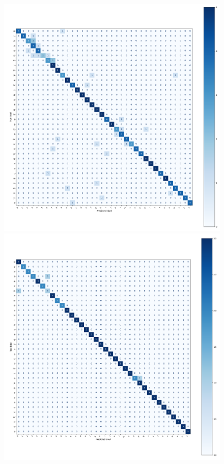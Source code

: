 \documentclass[a4paper,11pt,twoside]{report}
\theoremstyle{definition}
\begin{document}
\begin{figure}[H]
  \centering
    \begin{minipage}{0.49\linewidth}
      \centering
      \includegraphics[width=\linewidth]{img_appendix/cm_all_alphanum_mka.png}
  \end{minipage}
  \begin{minipage}{0.49\linewidth}
      \centering
      \includegraphics[width=\linewidth]{img_appendix/cm_all_alphanum_n.png}

\end{minipage}
\end{figure}
\end{document}
